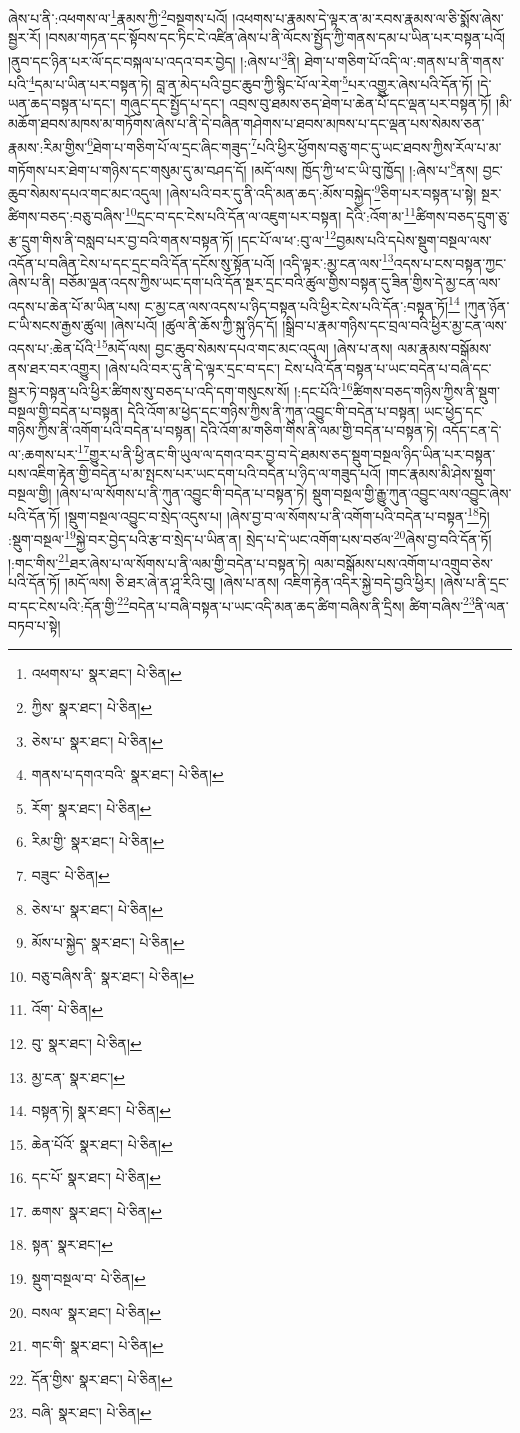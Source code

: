 ཞེས་པ་ནི་:འཕགས་ལ་\footnote{འཕགས་པ་  སྣར་ཐང་།  པེ་ཅིན། }རྣམས་ཀྱི་\footnote{ཀྱིས་  སྣར་ཐང་།  པེ་ཅིན། }བསྔགས་པའོ། །འཕགས་པ་རྣམས་དེ་ལྟར་ན་མ་རབས་རྣམས་ལ་ཅི་སྨོས་ཞེས་སྦྱར་རོ། །བསམ་གཏན་དང་སྟོབས་དང་ཏིང་ངེ་འཛིན་ཞེས་པ་ནི་ལོངས་སྤྱོད་ཀྱི་གནས་དམ་པ་ཡིན་པར་བསྟན་པའོ། །ནུབ་དང་ཉིན་པར་ལོ་དང་བསྐལ་པ་འདའ་བར་བྱེད། །:ཞེས་པ་\footnote{ཅེས་པ་  སྣར་ཐང་།  པེ་ཅིན། }ནི། ཐེག་པ་གཅིག་པོ་འདི་ལ་:གནས་པ་ནི་གནས་པའི་\footnote{གནས་པ་དགའ་བའི་  སྣར་ཐང་།  པེ་ཅིན། }དམ་པ་ཡིན་པར་བསྟན་ཏེ། བླ་ན་མེད་པའི་བྱང་ཆུབ་ཀྱི་སྙིང་པོ་ལ་རེག་\footnote{རོག་  སྣར་ཐང་།  པེ་ཅིན། }པར་འགྱུར་ཞེས་པའི་དོན་ཏོ། །དེ་ཡན་ཆད་བསྟན་པ་དང་། གཞུང་དང་སྤྱོད་པ་དང་། འབྲས་བུ་ཐམས་ཅད་ཐེག་པ་ཆེན་པོ་དང་ལྡན་པར་བསྟན་ཏོ། །མི་མཆོག་ཐབས་མཁས་མ་གཏོགས་ཞེས་པ་ནི་དེ་བཞིན་གཤེགས་པ་ཐབས་མཁས་པ་དང་ལྡན་པས་སེམས་ཅན་རྣམས་:རིམ་གྱིས་\footnote{རིམ་གྱི་  སྣར་ཐང་།  པེ་ཅིན། }ཐེག་པ་གཅིག་པོ་ལ་དྲང་ཞིང་གཟུད་\footnote{བཟུང་  པེ་ཅིན། }པའི་ཕྱིར་ཕྱོགས་བཅུ་གང་དུ་ཡང་ཐབས་ཀྱིས་རོལ་པ་མ་གཏོགས་པར་ཐེག་པ་གཉིས་དང་གསུམ་དུ་མ་བཤད་དོ། །མདོ་ལས། ཁྱོད་ཀྱི་ཕ་ང་ཡི་བུ་ཁྱོད། །:ཞེས་པ་\footnote{ཅེས་པ་  སྣར་ཐང་།  པེ་ཅིན། }ནས། བྱང་ཆུབ་སེམས་དཔའ་གང་མང་འདུལ། །ཞེས་པའི་བར་དུ་ནི་འདི་མན་ཆད་:མོས་བསྐྱེད་\footnote{མོས་པ་སྐྱེད་  སྣར་ཐང་།  པེ་ཅིན། }ཅིག་པར་བསྟན་པ་སྟེ། སྔར་ཚིགས་བཅད་:བཅུ་བཞིས་\footnote{བཅུ་བཞིས་ནི་  སྣར་ཐང་།  པེ་ཅིན། }དྲང་བ་དང་ངེས་པའི་དོན་ལ་འཇུག་པར་བསྟན། དེའི་:འོག་མ་\footnote{འོག་  པེ་ཅིན། }ཚིགས་བཅད་དྲུག་ཅུ་རྩ་དྲུག་གིས་ནི་བསླབ་པར་བྱ་བའི་གནས་བསྟན་ཏོ། །དང་པོ་ལ་ཕ་:བུ་ལ་\footnote{བུ་  སྣར་ཐང་།  པེ་ཅིན། }བྱམས་པའི་དཔེས་སྡུག་བསྔལ་ལས་འདོན་པ་བཞིན་ངེས་པ་དང་དྲང་བའི་དོན་དངོས་སུ་སྟོན་པའོ། །འདི་ལྟར་:མྱ་ངན་ལས་\footnote{མྱ་ངན་  སྣར་ཐང་། }འདས་པ་ངས་བསྟན་ཀྱང་ཞེས་པ་ནི། བཅོམ་ལྡན་འདས་ཀྱིས་ཡང་དག་པའི་དོན་སྔར་དྲང་བའི་ཚུལ་གྱིས་བསྟན་དུ་ཟིན་གྱིས་དེ་མྱ་ངན་ལས་འདས་པ་ཆེན་པོ་མ་ཡིན་པས། ང་མྱ་ངན་ལས་འདས་པ་ཉིད་བསྟན་པའི་ཕྱིར་ངེས་པའི་དོན་:བསྟན་ཏོ།\footnote{བསྟན་ཏེ།  སྣར་ཐང་།  པེ་ཅིན། } །ཀུན་ཉོན་ང་ཡི་སངས་རྒྱས་ཚུལ། །ཞེས་པའོ། །ཚུལ་ནི་ཆོས་ཀྱི་སྐུ་ཉིད་དོ། །སྒྲིབ་པ་རྣམ་གཉིས་དང་བྲལ་བའི་ཕྱིར་མྱ་ངན་ལས་འདས་པ་:ཆེན་པོའི་\footnote{ཆེན་པོའོ་  སྣར་ཐང་།  པེ་ཅིན། }མདོ་ལས། བྱང་ཆུབ་སེམས་དཔའ་གང་མང་འདུལ། །ཞེས་པ་ནས། ལམ་རྣམས་བསྒོམས་ནས་ཐར་བར་འགྱུར། །ཞེས་པའི་བར་དུ་ནི་དེ་ལྟར་དྲང་བ་དང་། ངེས་པའི་དོན་བསྟན་པ་ཡང་བདེན་པ་བཞི་དང་སྦྱར་ཏེ་བསྟན་པའི་ཕྱིར་ཚིགས་སུ་བཅད་པ་འདི་དག་གསུངས་སོ། །:དང་པོའི་\footnote{དང་པོ་  སྣར་ཐང་།  པེ་ཅིན། }ཚིགས་བཅད་གཉིས་ཀྱིས་ནི་སྡུག་བསྔལ་གྱི་བདེན་པ་བསྟན། དེའི་འོག་མ་ཕྱེད་དང་གཉིས་ཀྱིས་ནི་ཀུན་འབྱུང་གི་བདེན་པ་བསྟན། ཡང་ཕྱེད་དང་གཉིས་ཀྱིས་ནི་འགོག་པའི་བདེན་པ་བསྟན། དེའི་འོག་མ་གཅིག་གིས་ནི་ལམ་གྱི་བདེན་པ་བསྟན་ཏེ། འདོད་ངན་དེ་ལ་:ཆགས་པར་\footnote{ཆགས་  སྣར་ཐང་།  པེ་ཅིན། }གྱུར་པ་ནི་ཕྱི་ནང་གི་ཡུལ་ལ་དགའ་བར་བྱ་བ་དེ་ཐམས་ཅད་སྡུག་བསྔལ་ཉིད་ཡིན་པར་བསྟན་པས་འཇིག་རྟེན་གྱི་བདེན་པ་མ་སྤངས་པར་ཡང་དག་པའི་བདེན་པ་ཉིད་ལ་གཟུད་པའོ། །གང་རྣམས་མི་ཤེས་སྡུག་བསྔལ་གྱི། །ཞེས་པ་ལ་སོགས་པ་ནི་ཀུན་འབྱུང་གི་བདེན་པ་བསྟན་ཏེ། སྡུག་བསྔལ་གྱི་རྒྱུ་ཀུན་འབྱུང་ལས་འབྱུང་ཞེས་པའི་དོན་ཏོ། །སྡུག་བསྔལ་འབྱུང་བ་སྲེད་འདུས་པ། །ཞེས་བྱ་བ་ལ་སོགས་པ་ནི་འགོག་པའི་བདེན་པ་བསྟན་\footnote{སྟན་  སྣར་ཐང་། }ཏེ། :སྡུག་བསྔལ་\footnote{སྡུག་བསྔལ་བ་  པེ་ཅིན། }སྐྱེ་བར་བྱེད་པའི་རྩ་བ་སྲེད་པ་ཡིན་ན། སྲེད་པ་དེ་ཡང་འགོག་པས་བཙལ་\footnote{བསལ་  སྣར་ཐང་།  པེ་ཅིན། }ཞེས་བྱ་བའི་དོན་ཏོ། །:གང་གིས་\footnote{གང་གི་  སྣར་ཐང་།  པེ་ཅིན། }ཐར་ཞེས་པ་ལ་སོགས་པ་ནི་ལམ་གྱི་བདེན་པ་བསྟན་ཏེ། ལམ་བསྒོམས་པས་འགོག་པ་འགྲུབ་ཅེས་པའི་དོན་ཏོ། །མདོ་ལས། ཅི་ཐར་ཞེ་ན་ཤཱ་རིའི་བུ། །ཞེས་པ་ནས། འཇིག་རྟེན་འདིར་སྐྱེ་བདེ་བྱའི་ཕྱིར། །ཞེས་པ་ནི་དྲང་བ་དང་ངེས་པའི་:དོན་གྱི་\footnote{དོན་གྱིས་  སྣར་ཐང་།  པེ་ཅིན། }བདེན་པ་བཞི་བསྟན་པ་ཡང་འདི་མན་ཆད་ཚིག་བཞིས་ནི་དྲིས། ཚིག་བཞིས་\footnote{བཞི་  སྣར་ཐང་།  པེ་ཅིན། }ནི་ལན་བཏབ་པ་སྟེ། 